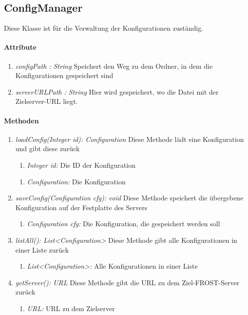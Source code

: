
\subsection{ConfigManager}
Diese Klasse ist für die Verwaltung der Konfigurationen zuständig.
\paragraph{Attribute}
\begin{enumerate}[-]
	\item \textit{configPath : String} Speichert den Weg zu dem Ordner, in dem die Konfigurationen gespeichert sind
	
	\item \textit{serverURLPath : String} Hier wird gespeichert, wo die Datei mit der Zielserver-URL liegt.		
\end{enumerate}

\paragraph{Methoden}
	
\begin{enumerate}[+]
	\item \textit{loadConfig(Integer id): Configuration} Diese Methode lädt eine Konfiguration und gibt diese zurück
		\begin{enumerate}[$\bullet$]
			\item \textit{Integer id:} Die ID der Konfiguration
		\end{enumerate}
		\vspace{-0.2cm}
		\begin{enumerate}[$\circ$]
			\item \textit{Configuration:} Die Konfiguration
		\end{enumerate}
	
	\item \textit{saveConfig(Configuration cfg): void} Diese Methode speichert die übergebene Konfiguration auf der Festplatte des Servers
	\begin{enumerate}[$\bullet$]
		\item \textit{Configuration cfg:} Die Konfiguration, die gespeichert werden soll
	\end{enumerate}
	
	\item \textit{listAll(): List<Configuration>} Diese Methode gibt alle Konfigurationen in einer Liste zurück	
	\begin{enumerate}[$\circ$]
		\item \textit{List<Configuration>:} Alle Konfigurationen in einer Liste
	\end{enumerate}
	
	\item \textit{getServer(): URL} Diese Methode gibt die URL zu dem Ziel-FROST-Server zurück
	\begin{enumerate}[$\circ$]
		\item \textit{URL:} URL zu dem Zielserver
	\end{enumerate}
\end{enumerate}